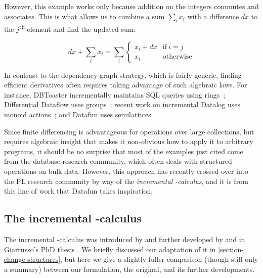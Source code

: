 However, this example works only because addition on the integers commutes and
associates. This is what allows us to combine a sum $\sum_i x_i$ with a
difference $dx$ to the $j$\textsuperscript{th} element and find the updated sum:

\[
dx + \sum_i x_i = \sum_i 
\begin{cases}
  x_i + dx & \text{if}~i = j\\
  x_i & \text{otherwise}
\end{cases}
\]

\noindent
In contrast to the dependency-graph strategy, which is fairly generic, finding
efficient derivatives often requires taking advantage of such algebraic laws.
%
For instance, DBToaster incrementally maintains SQL queries using
rings~\citep{DBLP:conf/pods/Koch10,Koch:183766}; Differential Dataflow uses
groups~\citep{DBLP:conf/cidr/McSherryMII13}; recent work on incremental Datalog
uses monoid actions~\citep{DBLP:conf/esop/Alvarez-Picallo19}; and Datafun uses
semilattices. 
%

Since finite differencing is advantageous for operations over large collections,
but requires algebraic insight that makes it non-obvious how to apply it to
arbitrary programs, it should be no surprise that most of the examples just
cited come from the database research community, which often deals with
structured operations on bulk data.
%
However, this approach has recently crossed over into the PL research community
by way of the \emph{incremental \fn-calculus}, and it is from this line of work
that Datafun takes inspiration.


\subsection{The incremental \boldfn-calculus}
\label{section-incremental-lambda-calculus}

The incremental \fn-calculus was introduced by \citet*{incremental} and further
developed by \citet*{DBLP:conf/esop/GiarrussoRS19} and in Giarrusso's PhD thesis
\citeyearpar{DBLP:phd/dnb/Giarrusso20}.
%
We briefly discussed our adaptation of it in \cref{section-change-structures},
but here we give a slightly fuller comparison (though still only a summary)
between our formulation, the original, and its further developments.

